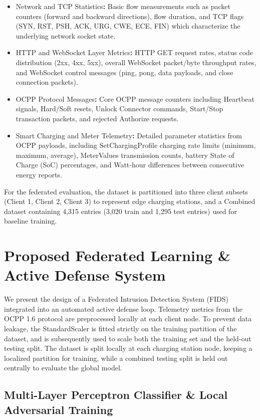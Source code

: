 \documentclass[10pt, a4paper, conference]{IEEEtran}
\begin{document}
\begin{itemize}
    \item Network and TCP Statistics\textbf{:} Basic flow measurements such as packet counters (forward and backward directions), flow duration, and TCP flags (SYN, RST, PSH, ACK, URG, CWE, ECE, FIN) which characterize the underlying network socket state.
    \item HTTP and WebSocket Layer Metrics\textbf{:} HTTP GET request rates, status code distribution (2xx, 4xx, 5xx), overall WebSocket packet/byte throughput rates, and WebSocket control messages (ping, pong, data payloads, and close connection packets).
    \item OCPP Protocol Messages\textbf{:} Core OCPP message counters including Heartbeat signals, Hard/Soft resets, Unlock Connector commands, Start/Stop transaction packets, and rejected Authorize requests.
    \item Smart Charging and Meter Telemetry\textbf{:} Detailed parameter statistics from OCPP payloads, including SetChargingProfile charging rate limits (minimum, maximum, average), MeterValues transmission counts, battery State of Charge (SoC) percentages, and Watt-hour differences between consecutive energy reports.
\end{itemize}
For the federated evaluation, the dataset is partitioned into three client subsets (Client 1, Client 2, Client 3) to represent edge charging stations, and a Combined dataset containing 4,315 entries (3,020 train and 1,295 test entries) used for baseline training.

\section{Proposed Federated Learning \& Active Defense System}\label{sec:fl_methodology}
We present the design of a Federated Intrusion Detection System (FIDS) integrated into an automated active defense loop. Telemetry metrics from the OCPP 1.6 protocol are preprocessed locally at each client node. To prevent data leakage, the StandardScaler is fitted strictly on the training partition of the dataset, and is subsequently used to scale both the training set and the held-out testing split. The dataset is split locally at each charging station node, keeping a localized partition for training, while a combined testing split is held out centrally to evaluate the global model.

\subsection{Multi-Layer Perceptron Classifier \& Local Adversarial Training}
\end{document}
